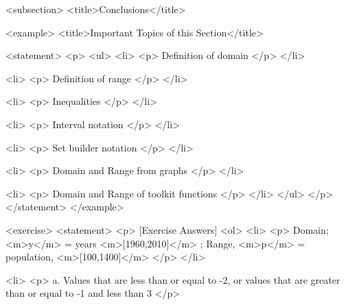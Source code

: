    <subsection>
        <title>Conclusions</title>

        <example>
            <title>Important Topics of this Section</title>

            <statement>
                <p>
                    <ul>
                        <li>
                            <p>
                                Definition of domain
                            </p>
                        </li>

                        <li>
                            <p>
                                Definition of range
                            </p>
                        </li>

                        <li>
                            <p>
                                Inequalities
                            </p>
                        </li>

                        <li>
                            <p>
                                Interval notation
                            </p>
                        </li>

                        <li>
                            <p>
                                Set builder notation
                            </p>
                        </li>

                        <li>
                            <p>
                                Domain and Range from graphs
                            </p>
                        </li>

                        <li>
                            <p>
                                Domain and Range of toolkit functions
                            </p>
                        </li>
                    </ul>
                </p>
            </statement>
        </example>

        <exercise>
            <statement>
                <p>
                    [Exercise Answers]
                    <ol>
                        <li>
                            <p>
                                Domain; <m>y</m> = years <m>[1960,2010]</m> ; Range, <m>p</m> = population, <m>[100,1400]</m>
                            </p>
                        </li>

                        <li>
                            <p>
                                a.
                                Values that are less than or equal to -2, or values that are greater than or equal to -1 and less than 3
                            </p>

